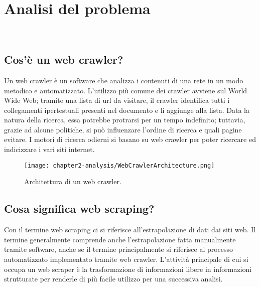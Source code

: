 
\chapter{Analisi del problema}
\label{cap:analisi-del-problema}

\\

\section{Cos'è un web crawler?}

Un web crawler è un software che analizza i contenuti di una rete in un modo metodico e automatizzato. L'utilizzo più comune dei crawler avviene sul World Wide Web; tramite una lista di \gls{url} da visitare, il crawler identifica tutti i collegamenti ipertestuali presenti nel documento e li aggiunge alla lista. Data la natura della ricerca, essa potrebbe protrarsi per un tempo indefinito; tuttavia, grazie ad alcune politiche, si può influenzare l'ordine di ricerca e quali pagine evitare. I motori di ricerca odierni si basano su web crawler per poter ricercare ed indicizzare i vari siti internet.

\begin{figure}[!h] 
    \centering 
    \texttt{[image: chapter2-analysis/WebCrawlerArchitecture.png]} 
    \caption{Architettura di un web crawler.}
\end{figure}

\section{Cosa significa web scraping?}

Con il termine web scraping ci si riferisce all'estrapolazione di dati dai siti web. Il termine generalmente comprende anche l'estrapolazione fatta manualmente tramite software, anche se il termine principalmente si riferisce al processo automatizzato implementato tramite web crawler. L'attività principale di cui si occupa un web scraper è la trasformazione di informazioni libere in informazioni strutturate per renderle di più facile utilizzo per una successiva analisi. 

